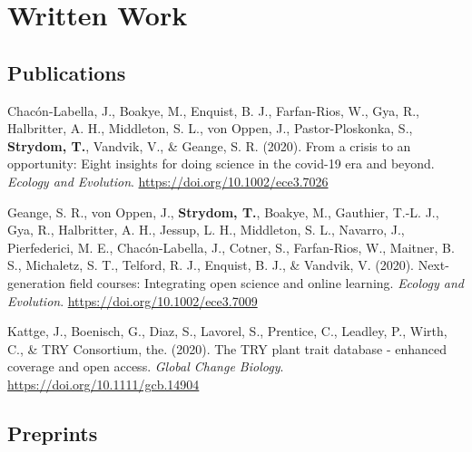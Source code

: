 \documentclass[11pt, a4paper]{awesome-cv}
\begin{document}
\newpage

\hypertarget{written-work}{%
\section{Written Work}\label{written-work}}

\vspace{\baselineskip}

\hypertarget{publications}{%
\subsection{\texorpdfstring{\textbf{Publications}}{Publications}}\label{publications}}

\begingroup
\setlength{\parindent}{-0.5in}
\setlength{\leftskip}{0.5in}

\hypertarget{refs_journals}{}
\leavevmode\hypertarget{ref-Chac_2020}{}%
Chacón-Labella, J., Boakye, M., Enquist, B. J., Farfan-Rios, W., Gya, R., Halbritter, A. H., Middleton, S. L., von Oppen, J., Pastor-Ploskonka, S., \textbf{Strydom, T.}, Vandvik, V., \& Geange, S. R. (2020). From a crisis to an opportunity: Eight insights for doing science in the covid-19 era and beyond. \emph{Ecology and Evolution}. \url{https://doi.org/10.1002/ece3.7026}

\leavevmode\hypertarget{ref-Geange_2020}{}%
Geange, S. R., von Oppen, J., \textbf{Strydom, T.}, Boakye, M., Gauthier, T.-L. J., Gya, R., Halbritter, A. H., Jessup, L. H., Middleton, S. L., Navarro, J., Pierfederici, M. E., Chacón-Labella, J., Cotner, S., Farfan-Rios, W., Maitner, B. S., Michaletz, S. T., Telford, R. J., Enquist, B. J., \& Vandvik, V. (2020). Next-generation field courses: Integrating open science and online learning. \emph{Ecology and Evolution}. \url{https://doi.org/10.1002/ece3.7009}

\leavevmode\hypertarget{ref-Kattge_2020}{}%
Kattge, J., Boenisch, G., Diaz, S., Lavorel, S., Prentice, C., Leadley, P., Wirth, C., \& TRY Consortium, the. (2020). The {TRY} plant trait database - enhanced coverage and open access. \emph{Global Change Biology}. \url{https://doi.org/10.1111/gcb.14904}

\endgroup
\vspace{\baselineskip}

\hypertarget{preprints}{%
\subsection{\texorpdfstring{\textbf{Preprints}}{Preprints}}\label{preprints}}
\end{document}
